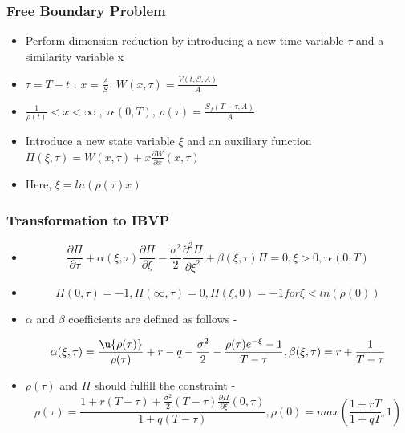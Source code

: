 \documentclass{beamer}
\begin{document}
\begin{frame}\frametitle{Free Boundary Problem}
    \begin{itemize}
        \item Perform dimension reduction by introducing a new time variable $\tau$ and a similarity variable x
        \item $\tau =  T-t$ , $x = \frac{A}{S}$, $W(x,\tau) = \frac{V(t,S,A)}{A}$
        \item $\frac{1}{\rho(t)} < x < \infty$ , $\tau\epsilon(0,T)$, $\rho(\tau) = \frac{S_{f}(T - \tau, A)}{A}$
        \item Introduce a new state variable $\xi$ and an auxiliary function $\Pi(\xi,\tau) = W(x,\tau) + x\frac{\partial W}{\partial x}(x,\tau)$
        \item Here, $\xi = ln(\rho(\tau)x)$
    \end{itemize}
\end{frame}
\begin{frame}\frametitle{Transformation to IBVP}
    \begin{itemize}
        \item \begin{equation}
            \frac{\partial \Pi}{\partial \tau} + \alpha(\xi, \tau)\frac{\partial \Pi}{\partial \xi} - \frac{\sigma^{2}}{2}\frac{\partial^{2} \Pi}{\partial \xi^{2}} + \beta(\xi, \tau)\Pi = 0, \xi > 0, \tau\epsilon(0,T)
            \end{equation}
        \item \begin{equation} 
            \Pi(0,\tau) = -1, \Pi(\infty,\tau) = 0, \Pi(\xi, 0) = -1 for \xi < ln(\rho(0))
        \end{equation}
        \item $\alpha$ and $\beta$ coefficients are defined as follows - 
            
                \begin{equation}
                    \alpha(\xi,\tau) = \frac{\u{\rho(\tau)}}{\rho(\tau)} + r-q - \frac{\sigma^{2}}{2} - \frac{\rho(\tau)e^{-\xi} - 1}{T - \tau}, \beta(\xi, \tau) = r + \frac{1}{T - \tau}
                \end{equation}
        \item $\rho(\tau)$ and $\Pi$ should fulfill the constraint - 
        \begin{equation}
            \rho(\tau) = \frac{1 + r(T-\tau) + \frac{\sigma^{2}}{2}(T-\tau)\frac{\partial \Pi}{\partial \xi}(0,\tau)}{1 + q(T- \tau)} , \rho(0) = max(\frac{1 + rT}{1 + qT},1)
        \end{equation}
    \end{itemize}
    
\end{frame}
\end{document}
